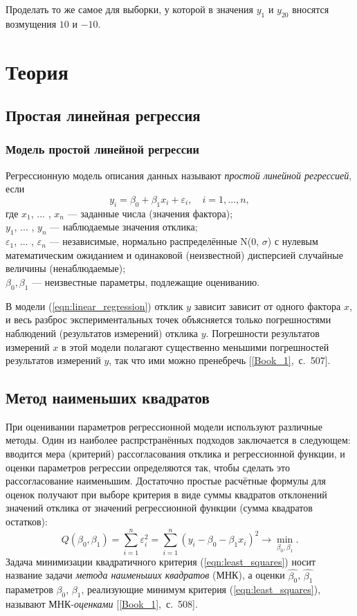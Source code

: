 \documentclass[12pt,a4paper]{article}
\begin{document}
	Проделать то же самое для выборки, у которой в значения $y_1$ и $y_{20}$ вносятся возмущения $10$ и $-10$.
	
	\section{Теория}
	\subsection{Простая линейная регрессия}
	\subsubsection{Модель простой линейной регрессии}
	Регрессионную модель описания данных называют \emph{простой линейной регрессией}, если
	\begin{equation}\label{eqn:linear_regression}
	y_i = \beta_0 + \beta_1x_i + \varepsilon_i, \quad i = 1, ... , n,
	\end{equation}
	где $x_1$, ... , $x_n$ --- заданные числа (значения фактора);\\
	$y_1$, ... , $y_n$ --- наблюдаемые значения отклика;\\ $\varepsilon_1$, ... , $\varepsilon_n$ — независимые, нормально распределённые N(0, $\sigma$) с нулевым математическим ожиданием и одинаковой (неизвестной) дисперсией случайные величины (ненаблюдаемые);\\ $\beta_0, \beta_1$ — неизвестные параметры, подлежащие оцениванию.
	
	В модели (\ref{eqn:linear_regression}) отклик $y$ зависит зависит от одного фактора $x$, и весь разброс экспериментальных точек объясняется только погрешностями наблюдений (результатов измерений) отклика $y$. Погрешности результатов измерений $x$ в этой модели полагают существенно меньшими погрешностей результатов измерений $y$, так что ими можно пренебречь [\ref{Book_1},~с.~507].
	
	\subsection{Метод наименьших квадратов}
	При оценивании параметров регрессионной модели используют различные методы. Один из наиболее распрстранённых подходов заключается в следующем: вводится мера (критерий) рассогласования отклика и регрессионной функции, и оценки параметров регрессии определяются так, чтобы сделать это рассогласование наименьшим. Достаточно простые расчётные формулы для оценок получают при выборе критерия в виде суммы квадратов отклонений значений отклика от значений регрессионной функции (сумма квадратов остатков):
	\begin{equation}\label{eqn:least_squares}
	Q(\beta_0, \beta_1) = \sum_{i = 1}^{n} \varepsilon^2_i = \sum_{i = 1}^{n} (y_i - \beta_0 - \beta_1 x_i)^2 \rightarrow \min_{\beta_0, \beta_1}.
	\end{equation}
	Задача минимизации квадратичного критерия (\ref{eqn:least_squares}) носит название задачи \emph{метода наименьших квадратов} (МНК), а оценки $\hat{\beta_0}$, $\hat{\beta_1}$ параметров $\beta_0$, $\beta_1$, реализующие минимум критерия (\ref{eqn:least_squares}), называют МНК-\emph{оценками} [\ref{Book_1},~с.~508].
	
\end{document}
